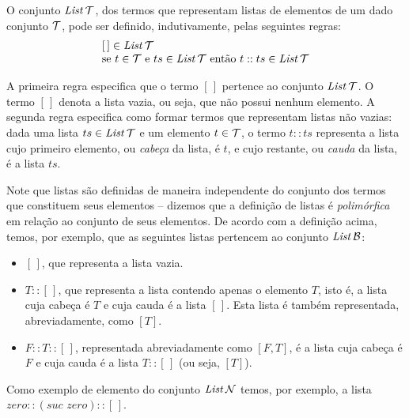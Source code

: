 \begin{Definition}
O conjunto $\textit{List\/}\, \mathcal{T}$, dos termos que representam listas de elementos de um dado conjunto $\mathcal{T}$, pode ser definido, indutivamente, pelas seguintes regras:
  \[
  \begin{array}{l}
    [\,] \in \textit{List\/}\,\mathcal{T} \\
    \text{se $t \in \mathcal{T}$ e $ts \in \textit{List\/}\,\mathcal{T}$ ent\~ao  $t :: ts \in \textit{List\/}\,\mathcal{T}$}
  \end{array}
  \]
\end{Definition}
A primeira regra especifica que o termo $[\,]$ pertence ao conjunto $\textit{List\/}\,\mathcal{T}$. O termo $[\,]$  denota a lista vazia, ou seja, que n\~ao possui nenhum elemento. A segunda regra especifica como formar termos que representam listas não vazias: dada uma lista $ts \in \textit{List\/}\,\mathcal{T}$ e um elemento $t \in\mathcal{T}$, o termo $t :: ts$ representa a lista cujo primeiro elemento, ou \emph{cabeça} da lista, é $t$, e cujo restante, ou \emph{cauda} da lista, é a lista $ts$.

Note que listas são definidas de maneira independente do conjunto dos termos que constituem seus elementos -- dizemos que a definição de listas \'e \emph{polim\'orfica\/} em rela\c{c}\~ao ao conjunto de seus elementos. De acordo com a definição acima, temos, por exemplo, que as seguintes listas pertencem ao conjunto $\textit{List\/}\,\mathcal{B}$:
\begin{itemize}
  \item $[\,]$, que representa a lista vazia.
  \item $T :: [\,]$, que representa a lista contendo apenas o elemento $T$, isto é, a lista cuja cabe\c{c}a \'e $T$ e cuja cauda é a lista $[\,]$. Esta lista é também representada, abreviadamente, como $[T]$.
  \item $F :: T :: [\,]$, representada abreviadamente como $[F,T]$, é a lista cuja cabe\c{c}a \'e $F$ e cuja cauda é a lista $T :: [\,]$ (ou seja, $[T]$).
\end{itemize}
Como exemplo de elemento do conjunto $\textit{List\/}\,\mathcal{N}$ temos, por exemplo, a lista $zero :: (suc\,\,zero) :: [\,]$.


